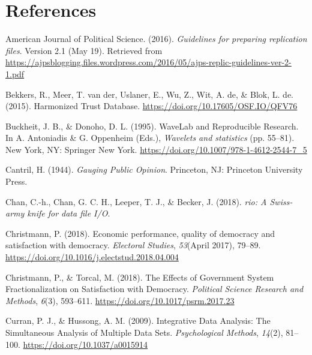 \documentclass[12pt,]{article}
\begin{document}
\normalsize

\hypertarget{references}{%
\section{References}\label{references}}

\renewcommand{\baselinestretch}{1}\normalsize
\parindent 0in
\leftskip 0.2in

\parindent -0.2in

\hypertarget{refs}{}
\leavevmode\hypertarget{ref-AJPS2016}{}%
American Journal of Political Science. (2016). \emph{Guidelines for preparing replication files}. Version 2.1 (May 19). Retrieved from \url{https://ajpsblogging.files.wordpress.com/2016/05/ajps-replic-guidelines-ver-2-1.pdf}

\leavevmode\hypertarget{ref-Bekkers2015}{}%
Bekkers, R., Meer, T. van der, Uslaner, E., Wu, Z., Wit, A. de, \& Blok, L. de. (2015). Harmonized Trust Database. \url{https://doi.org/10.17605/OSF.IO/QFV76}

\leavevmode\hypertarget{ref-Buckheit1995}{}%
Buckheit, J. B., \& Donoho, D. L. (1995). WaveLab and Reproducible Research. In A. Antoniadis \& G. Oppenheim (Eds.), \emph{Wavelets and statistics} (pp. 55--81). New York, NY: Springer New York. \url{https://doi.org/10.1007/978-1-4612-2544-7_5}

\leavevmode\hypertarget{ref-Cantril1944}{}%
Cantril, H. (1944). \emph{Gauging Public Opinion}. Princeton, NJ: Princeton University Press.

\leavevmode\hypertarget{ref-rio}{}%
Chan, C.-h., Chan, G. C. H., Leeper, T. J., \& Becker, J. (2018). \emph{rio: A Swiss-army knife for data file I/O}.

\leavevmode\hypertarget{ref-Christmann2018}{}%
Christmann, P. (2018). Economic performance, quality of democracy and satisfaction with democracy. \emph{Electoral Studies}, \emph{53}(April 2017), 79--89. \url{https://doi.org/10.1016/j.electstud.2018.04.004}

\leavevmode\hypertarget{ref-Christmann2018a}{}%
Christmann, P., \& Torcal, M. (2018). The Effects of Government System Fractionalization on Satisfaction with Democracy. \emph{Political Science Research and Methods}, \emph{6}(3), 593--611. \url{https://doi.org/10.1017/psrm.2017.23}

\leavevmode\hypertarget{ref-Curran2009}{}%
Curran, P. J., \& Hussong, A. M. (2009). Integrative Data Analysis: The Simultaneous Analysis of Multiple Data Sets. \emph{Psychological Methods}, \emph{14}(2), 81--100. \url{https://doi.org/10.1037/a0015914}
\end{document}
